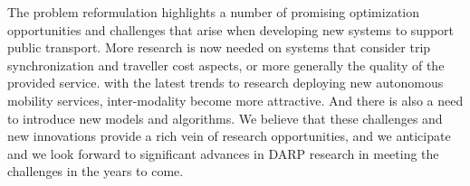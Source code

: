 \documentclass{article}
\begin{document}
The problem reformulation highlights a number of promising optimization opportunities and challenges that arise when developing new systems to support public transport.
More research is now needed on systems that consider trip synchronization and traveller cost aspects, or more generally the quality of the provided service. with the latest trends to research deploying new autonomous mobility services, inter-modality become more attractive. And there is also a need to introduce new models and algorithms.
We believe that these challenges and new innovations provide a rich vein of research opportunities, and we anticipate and we look forward to significant advances in DARP research in meeting the challenges in the years to come.



\end{document}
